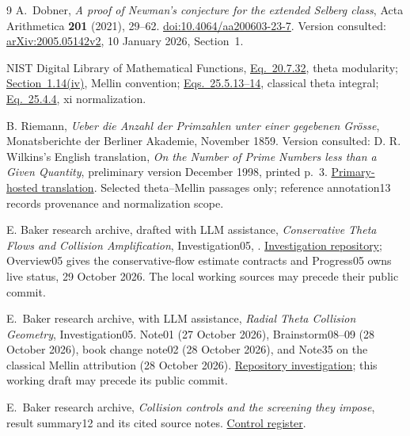 \documentclass[11pt]{article}
\theoremstyle{remark}
\numberwithin{equation}{section}
\begin{document}
\begin{thebibliography}{9}
A.~Dobner, \emph{A proof of Newman's conjecture for the extended Selberg
class}, Acta Arithmetica \textbf{201} (2021), 29--62.
\href{https://doi.org/10.4064/aa200603-23-7}{doi:10.4064/aa200603-23-7}.
Version consulted: \href{https://arxiv.org/abs/2005.05142v2}
{arXiv:2005.05142v2}, 10 January 2026, Section~1.

NIST Digital Library of Mathematical Functions,
\href{https://dlmf.nist.gov/20.7.E32}{Eq.~20.7.32}, theta modularity;
\href{https://dlmf.nist.gov/1.14.iv}{Section~1.14(iv)}, Mellin convention;
\href{https://dlmf.nist.gov/25.5.E13}{Eqs.~25.5.13--14}, classical
theta integral; \href{https://dlmf.nist.gov/25.4.E4}{Eq.~25.4.4},
xi normalization.

B. Riemann, \emph{Ueber die Anzahl der Primzahlen unter einer gegebenen
Gr\"osse}, Monatsberichte der Berliner Akademie, November 1859.
Version consulted: D. R. Wilkins's English translation,
\emph{On the Number of Prime Numbers less than a Given Quantity},
preliminary version December 1998, printed p.~3.
\href{https://www.maths.tcd.ie/pub/HistMath/People/Riemann/Zeta/EZeta.pdf}
{Primary-hosted translation}. Selected theta--Mellin passages only;
reference annotation13 records provenance and normalization scope.

E. Baker research archive, drafted with LLM assistance,
\emph{Conservative Theta Flows and Collision Amplification},
Investigation05, .
\href{https://github.com/ebbaker/shifted-zeta-positivity/tree/main/papers/investigations-5/05_radial_theta_collision_geometry}
{Investigation repository}; Overview05 gives the conservative-flow
estimate contracts and Progress05 owns live status, 29 October 2026.
The local working sources may precede their public commit.

E.~Baker research archive, with LLM assistance,
\emph{Radial Theta Collision Geometry}, Investigation05.
Note01 (27 October 2026), Brainstorm08--09 (28 October 2026),
book change note02 (28 October 2026), and Note35 on the classical
Mellin attribution (28 October 2026).
\href{https://github.com/ebbaker/shifted-zeta-positivity/tree/main/papers/investigations-5/05_radial_theta_collision_geometry}
{Repository investigation}; this working draft may precede its public commit.

E.~Baker research archive, \emph{Collision controls and the screening
they impose}, result summary12 and its cited source notes.
\href{https://github.com/ebbaker/shifted-zeta-positivity/blob/main/result-summaries/12_collision_controls_and_screening.md}
{Control register}.


\end{thebibliography}
\end{document}
